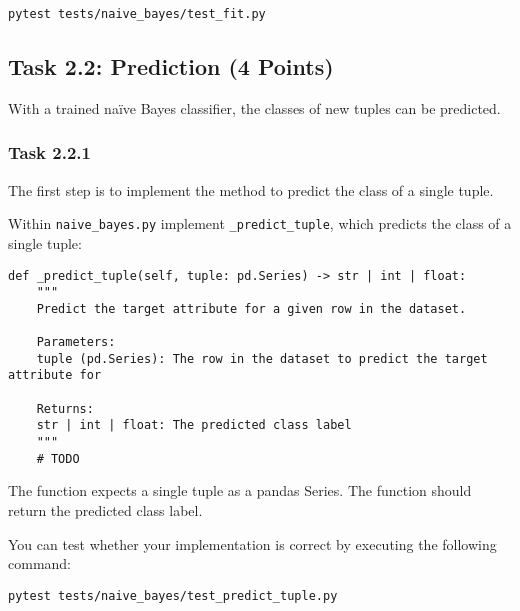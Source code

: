 \documentclass[
english,
smallborders
]{i6prcsht}
\newcommand{\points}[1]{\hfill \color{red}(#1 Points)\color{black}}
\begin{document}
\vspace*{0.3cm}

\begin{lstlisting}
pytest tests/naive_bayes/test_fit.py
\end{lstlisting}

\vspace*{0.1cm}

\subsection*{Task 2.2: Prediction \points{4}}

With a trained naïve Bayes classifier, the classes of new tuples can be predicted.

\subsubsection*{Task 2.2.1}

The first step is to implement the method to predict the class of a single tuple.

Within \texttt{naive\_bayes.py} implement \texttt{\_predict\_tuple}, which predicts the class of a single tuple:

\vspace*{0.3cm}

\begin{lstlisting}
def _predict_tuple(self, tuple: pd.Series) -> str | int | float:
	"""
	Predict the target attribute for a given row in the dataset.

	Parameters:
	tuple (pd.Series): The row in the dataset to predict the target attribute for

	Returns:
	str | int | float: The predicted class label
	"""
	# TODO
\end{lstlisting}

\vspace*{0.1cm}

The function expects a single tuple as a pandas Series. The function should return the predicted class label.

You can test whether your implementation is correct by executing the following command:

\vspace*{0.3cm}

\begin{lstlisting}
pytest tests/naive_bayes/test_predict_tuple.py
\end{lstlisting}

\vspace*{0.1cm}
\end{document}
